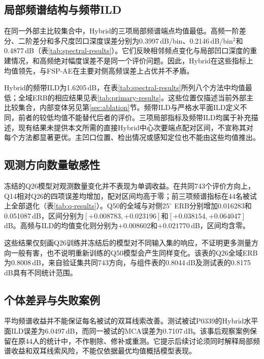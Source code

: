 \subsection{局部频谱结构与频带ILD}
在同一外部主比较集合中，Hybrid的三项局部频谱端点均值最低。高频一阶差分、二阶差分和多尺度凹口深度误差分别为0.3997\,dB/bin、0.2146\,dB/bin$^2$和0.4877\,dB（表\ref{tab:spectral-results}）。它们反映相邻频点变化与局部凹口深度的重建情况，和高频绝对幅度误差不是同一个评价问题。因此，Hybrid在这些指标上均值领先，与FSP-AE在主要对侧高频误差上占优并不矛盾。



Hybrid的频带ILD为1.6205\,dB，在表\ref{tab:spectral-results}所列八个方法中均值最低；全域ERB的相应结果见表\ref{tab:primary-results}。这些位置仅描述当前外部主比较集合，内部变体另见第\ref{sec:ablation}节。频带ILD与严格水平面ILD定义不同，前者的较低均值不能替代后者的评价。三项局部指标及频带ILD均属于补充描述，现有结果未提供本文所需的直接Hybrid中心次要端点配对区间，不宣称其对每个方法都显著更优。主凹口位置、检出情况或感知定位也不能由这些均值推出。



\subsection{观测方向数量敏感性}
冻结的Q26模型对观测数量变化并不表现为单调收益。在共同743个评价方向上，Q14相对Q26的四项误差均增加，配对区间均高于零；前三项频谱指标在44名被试上全部退化（表\ref{tab:q-results}）。Q50的全域与对侧$25^\circ$ ERB分别增加0.016283和0.051087\,dB，区间分别为$[+0.008783,+0.023196]$和$[+0.038154,+0.064047]$\,dB。高频与ILD的均值变化则分别为$+0.008602$和$+0.021770$\,dB，区间均含零。



这些结果仅刻画Q26训练并冻结后的模型对不同输入集的响应，不证明更多测量方向一般有害，也不说明重新训练的Q50模型会产生同样变化。该表的Q26全域ERB为0.8008\,dB，来自验证集共同743方向，与组件表的0.8044\,dB及测试表的0.8175\,dB具有不同统计范围。

\subsection{个体差异与失败案例}
平均频谱收益并不能保证每名被试的双耳线索改善。测试被试P0339的Hybrid水平面ILD误差为6.0497\,dB，而同一被试的MCA误差为0.7107\,dB。该事后观察案例保留在原44人的统计中，不作剔除、修补或重测。它提示后续讨论须同时解释局部频谱收益和双耳线索风险，不能仅依据最优均值概括模型表现。
